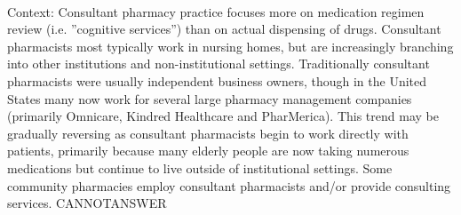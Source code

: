 \documentclass[11pt,a4paper, onecolumn]{article}
\begin{document}
\\ Context: Consultant pharmacy practice focuses more on medication regimen review (i.e. ''cognitive services'') than on actual dispensing of drugs. Consultant pharmacists most typically work in nursing homes, but are increasingly branching into other institutions and non-institutional settings. Traditionally consultant pharmacists were usually independent business owners, though in the United States many now work for several large pharmacy management companies (primarily Omnicare, Kindred Healthcare and PharMerica). This trend may be gradually reversing as consultant pharmacists begin to work directly with patients, primarily because many elderly people are now taking numerous medications but continue to live outside of institutional settings. Some community pharmacies employ consultant pharmacists and/or provide consulting services. CANNOTANSWER
\end{document}
